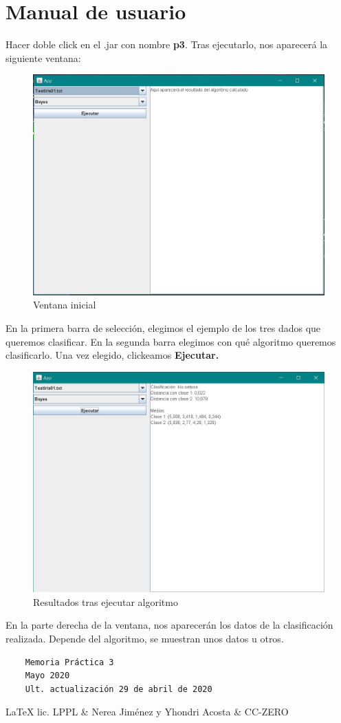\documentclass[12pt]{article}
\begin{document}
\section{Manual de usuario}
Hacer doble click en el .jar con nombre \textbf{p3}. Tras ejecutarlo, nos aparecerá la siguiente ventana:
\begin{figure}[H]
    \centering
    \includegraphics[width=1\textwidth]{primera.JPG}
    \caption{Ventana inicial}
\end{figure}
En la primera barra de selección, elegimos el ejemplo de los tres dados que queremos clasificar. En la segunda barra elegimos con qué algoritmo queremos clasificarlo. Una vez elegido, clickeamos \textbf{Ejecutar.}
\begin{figure}[H]
    \centering
    \includegraphics[width=1\textwidth]{segunda.JPG}
    \caption{Resultados tras ejecutar algoritmo}
\end{figure}
En la parte derecha de la ventana, nos aparecerán los datos de la clasificación realizada. Depende del algoritmo, se muestran unos datos u otros.
\newpage
\vspace*{\fill}
\begin{verbatim}
    Memoria Práctica 3
    Mayo 2020
    Ult. actualización 29 de abril de 2020
\end{verbatim}
\LaTeX{} lic. LPPL \& Nerea Jiménez y Yhondri Acosta \& CC-ZERO
\doclicenseThis
\end{document}
